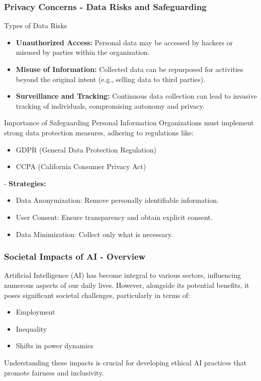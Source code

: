 \documentclass{beamer}
\begin{document}
\begin{frame}[fragile]
    \frametitle{Privacy Concerns - Data Risks and Safeguarding}
    \begin{block}{Types of Data Risks}
        \begin{itemize}
            \item \textbf{Unauthorized Access:} Personal data may be accessed by hackers or misused by parties within the organization.
            \item \textbf{Misuse of Information:} Collected data can be repurposed for activities beyond the original intent (e.g., selling data to third parties).
            \item \textbf{Surveillance and Tracking:} Continuous data collection can lead to invasive tracking of individuals, compromising autonomy and privacy.
        \end{itemize}
    \end{block}
    
    \begin{block}{Importance of Safeguarding Personal Information}
        Organizations must implement strong data protection measures, adhering to regulations like:
        \begin{itemize}
            \item GDPR (General Data Protection Regulation)
            \item CCPA (California Consumer Privacy Act)
        \end{itemize}
        - \textbf{Strategies:}
        \begin{itemize}
            \item Data Anonymization: Remove personally identifiable information.
            \item User Consent: Ensure transparency and obtain explicit consent.
            \item Data Minimization: Collect only what is necessary.
        \end{itemize}
    \end{block}
\end{frame}

\begin{frame}[fragile]
    \frametitle{Societal Impacts of AI - Overview}
    Artificial Intelligence (AI) has become integral to various sectors, influencing numerous aspects of our daily lives. However, alongside its potential benefits, it poses significant societal challenges, particularly in terms of:
    \begin{itemize}
        \item Employment
        \item Inequality
        \item Shifts in power dynamics
    \end{itemize}
    Understanding these impacts is crucial for developing ethical AI practices that promote fairness and inclusivity.
\end{frame}
\end{document}
